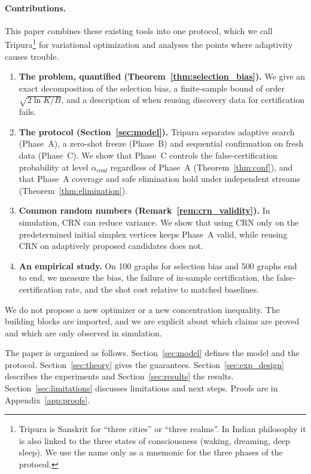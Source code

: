 \documentclass[a4paper,onecolumn,unpublished]{quantumarticle}
\newcommand{\aconf}{\alpha_{\mathrm{conf}}}
\begin{document}
\paragraph*{Contributions.}
This paper combines these existing tools into one protocol, which we call Tripura\footnote{Tripura is Sanskrit for ``three cities'' or ``three realms''. In Indian philosophy it is also linked to the three states of consciousness (waking, dreaming, deep sleep). We use the name only as a mnemonic for the three phases of the protocol.} for variational optimization and analyses the points where adaptivity causes trouble.
\begin{enumerate}
  \item \textbf{The problem, quantified (Theorem~\ref{thm:selection_bias}).} We give an exact decomposition of the selection bias, a finite-sample bound of order $\sqrt{2\ln K / B}$, and a description of when reusing discovery data for certification fails.
  \item \textbf{The protocol (Section~\ref{sec:model}).} Tripura separates adaptive search (Phase~A), a zero-shot freeze (Phase~B) and sequential confirmation on fresh data (Phase~C). We show that Phase~C controls the false-certification probability at level $\aconf$ regardless of Phase~A (Theorem~\ref{thm:conf}), and that Phase~A coverage and safe elimination hold under independent streams (Theorem~\ref{thm:elimination}).
  \item \textbf{Common random numbers (Remark~\ref{rem:crn_validity}).} In simulation, CRN can reduce variance. We show that using CRN only on the predetermined initial simplex vertices keeps Phase~A valid, while reusing CRN on adaptively proposed candidates does not.
  \item \textbf{An empirical study.} On 100 graphs for selection bias and 500 graphs end to end, we measure the bias, the failure of in-sample certification, the false-certification rate, and the shot cost relative to matched baselines.
\end{enumerate}
We do not propose a new optimizer or a new concentration inequality. The building blocks are imported, and we are explicit about which claims are proved and which are only observed in simulation.

The paper is organised as follows. Section~\ref{sec:model} defines the model and the protocol. Section~\ref{sec:theory} gives the guarantees. Section~\ref{sec:exp_design} describes the experiments and Section~\ref{sec:results} the results. Section~\ref{sec:limitations} discusses limitations and next steps. Proofs are in Appendix~\ref{app:proofs}.
\end{document}
